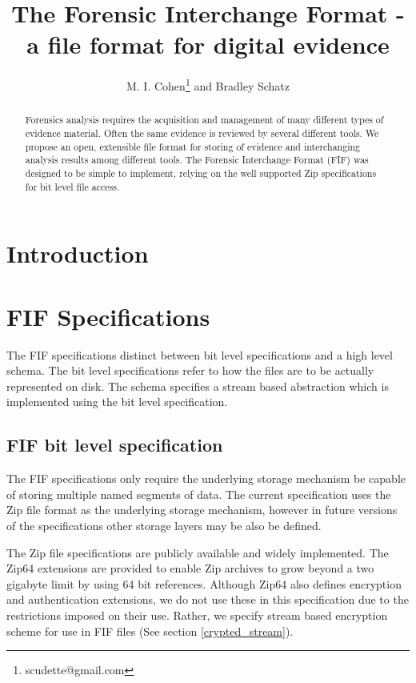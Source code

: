 \documentclass[10pt, conference]{IEEEtran}
\begin{document}
\title{The Forensic Interchange Format - a file format for digital evidence}
\author{M. I. Cohen\footnote{scudette@gmail.com} and Bradley Schatz}
\maketitle

\begin{abstract}
Forensics analysis requires the acquisition and management of many
different types of evidence material. Often the same evidence is
reviewed by several different tools. We propose an open, extensible
file format for storing of evidence and interchanging analysis results
among different tools. The Forensic Interchange Format (FIF) was
designed to be simple to implement, relying on the well supported Zip
specifications for bit level file access.
\end{abstract}

\section{Introduction}

\section{FIF Specifications}
The FIF specifications distinct between bit level specifications and
a high level schema. The bit level specifications refer to how the
files are to be actually represented on disk. The schema specifies a
stream based abstraction which is implemented using the bit level
specification. 

\subsection{FIF bit level specification}
The FIF specifications only require the underlying storage mechanism
be capable of storing multiple named segments of data. The current
specification uses the Zip file format as the underlying storage
mechanism, however in future versions of the specifications other
storage layers may be also be defined.

The Zip file specifications are publicly available and widely
implemented. The Zip64 extensions are provided to enable Zip archives
to grow beyond a two gigabyte limit by using 64 bit
references. Although Zip64 also defines encryption and authentication
extensions, we do not use these in this specification due to the
restrictions imposed on their use. Rather, we specify stream based
encryption scheme for use in FIF files (See section
\ref{crypted_stream}).
\end{document}
